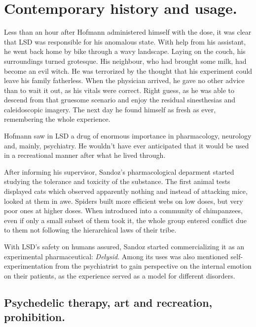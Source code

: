 \section{Contemporary history and usage.} \label{now-history}

Less than an hour after Hofmann administered himself with the dose, it was clear that LSD was responsible for his anomalous state. With help from his assistant, he went back home by bike through a wavy landscape. Laying on the couch, his surroundings turned grotesque. His neighbour, who had brought some milk, had become an evil witch. He was terrorized by the thought that his experiment could leave his family fatherless. When the physician arrived, he gave no other advice than to wait it out, as his vitals were correct. Right guess, as he was able to descend from that gruesome scenario and enjoy the residual sinesthesias and caleidoscopic imagery. The next day he found himself as fresh as ever, remembering the whole experience.

Hofmann saw in LSD a drug of enormous importance in pharmacology, neurology and, mainly, psychiatry. He wouldn't have ever anticipated that it would be used in a recreational manner after what he lived through.

After informing his supervisor, Sandoz's pharmacological deparment started studying the tolerance and toxicity of the substance. The first animal tests displayed cats which observed apparently nothing and instead of attacking mice, looked at them in awe. Spiders built more efficient webs on low doses, but very poor ones at higher doses. When introduced into a community of chimpanzees, even if only a small subset of them took it, the whole group entered conflict due to them not following the hierarchical laws of their tribe.

With LSD's safety on humans assured, Sandoz started commercializing it as an experimental pharmaceutical: \textit{Delysid}. Among its uses was also mentioned self-experimentation from the psychiatrist to gain perspective on the internal emotion on their patients, as the experience served as a model for different disorders.

\subsection{Psychedelic therapy, art and recreation, prohibition.}


